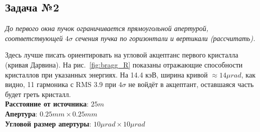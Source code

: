 \documentclass[14pt,a4paper]{extarticle}
\numberwithin{equation}{section}
\begin{document}
\subsection{Задача №2}
\textit{До первого окна пучок ограничивается прямоугольной апертурой, соответствующей $4\sigma$ сечения пучка по горизонтали и вертикали (рассчитать).}

Здесь лучше писать ориентировать на угловой акцептанс первого кристалла (кривая Дарвина). На рис.~\ref{fig:bragg_R} показаны отражающие способности кристаллов при указанных энергиях. На 14.4 кэВ, ширина кривой $\approx 14 \mu rad$, как видно, 11 гармоника с RMS 3.9 при $4\sigma$ не войдёт в акцептант, оставшаяся часть будет греть кристалл.\\
\textbf{Расстояние от источника}: $25m$\\
\textbf{Апертура}: $0.25mm \times 0.25mm$\\
\textbf{Угловой размер апертуры}: $10\mu rad \times  10 \mu rad$ 
\end{document}
